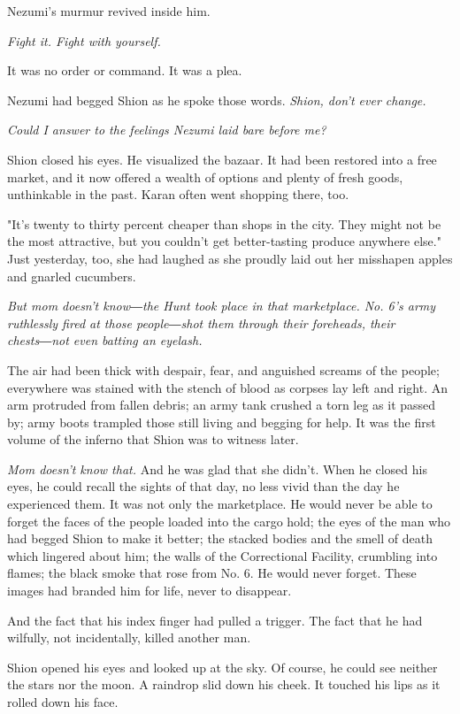 Nezumi's murmur revived inside him.

\emph{Fight it. Fight with yourself.}

It was no order or command. It was a plea.

Nezumi had begged Shion as he spoke those words. \emph{Shion, don't ever
change.}

\emph{Could I answer to the feelings Nezumi laid bare before me?}

Shion closed his eyes. He visualized the bazaar. It had been restored
into a free market, and it now offered a wealth of options and plenty of
fresh goods, unthinkable in the past. Karan often went shopping there,
too.

"It's twenty to thirty percent cheaper than shops in the city. They
might not be the most attractive, but you couldn't get better-tasting
produce anywhere else." Just yesterday, too, she had laughed as she
proudly laid out her misshapen apples and gnarled cucumbers.

\emph{But mom doesn't know―the Hunt took place in that marketplace. No. 6's
army ruthlessly fired at those people―shot them through their foreheads,
their chests―not even batting an eyelash.}

The air had been thick with despair, fear, and anguished screams of the
people; everywhere was stained with the stench of blood as corpses lay
left and right. An arm protruded from fallen debris; an army tank
crushed a torn leg as it passed by; army boots trampled those still
living and begging for help. It was the first volume of the inferno that
Shion was to witness later.

\emph{Mom doesn't know that.} And he was glad that she didn't. When he closed
his eyes, he could recall the sights of that day, no less vivid than the
day he experienced them. It was not only the marketplace. He would never
be able to forget the faces of the people loaded into the cargo hold;
the eyes of the man who had begged Shion to make it better; the stacked
bodies and the smell of death which lingered about him; the walls of the
Correctional Facility, crumbling into flames; the black smoke that rose
from No. 6. He would never forget. These images had branded him for
life, never to disappear.

And the fact that his index finger had pulled a trigger. The fact that
he had wilfully, not incidentally, killed another man.

Shion opened his eyes and looked up at the sky. Of course, he could see
neither the stars nor the moon. A raindrop slid down his cheek. It
touched his lips as it rolled down his face.

